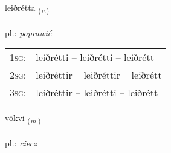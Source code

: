 \documentclass[frontgrid, backgrid]{flacards}\usepackage[]{graphicx}\usepackage[]{xcolor}
\begin{document}
\renewcommand{\flhead}{\vskip5pt \fboxsep=0pt {\small\bfseries\footnotesize Nafnorð | czasownik}}
\renewcommand{\fcfoot}{\vskip5pt \fboxsep=0pt \hspace{2pt}{\small\bfseries\footnotesize 3K}}

\renewcommand{\blhead}{\vskip5pt {\small\bfseries\footnotesize Nafnorð | czasownik }}
\renewcommand{\bcfoot}{\vskip5pt \hspace{2pt}{\small\bfseries\footnotesize 3K}}


{leiðrétta \small{\textsubscript{(\textit{v.})}} \\[1ex] %
\textphonetic{[leiðrjɛhta]} \\
pl.: \emph{poprawić} \\  [2ex]
\renewcommand*{\arraystretch}{0.8}
\begin{tabular}{p{1cm}l}
\textsc{1sg}: & leiðrétti -- leiðrétti -- leiðrétt \\ 
\textsc{2sg}: & leiðréttir -- leiðréttir -- leiðrétt \\ 
\textsc{3sg}: & leiðréttir -- leiðrétti -- leiðrétt \\ 
\end{tabular}
}

\renewcommand{\flhead}{\vskip5pt \fboxsep=0pt {\small\bfseries\footnotesize Nafnorð | rzeczownik}}
\renewcommand{\fcfoot}{\vskip5pt \fboxsep=0pt \hspace{2pt}{\small\bfseries\footnotesize 3K}}

\renewcommand{\blhead}{\vskip5pt {\small\bfseries\footnotesize Nafnorð | rzeczownik }}
\renewcommand{\bcfoot}{\vskip5pt \hspace{2pt}{\small\bfseries\footnotesize 3K}}


{vökvi \small{\textsubscript{(\textit{m.})}} \\[1ex] %
\textphonetic{[vœkvɪ]} \\
pl.: \emph{ciecz} \\  [2ex]
\renewcommand*{\arraystretch}{0.8}
}
\end{document}
